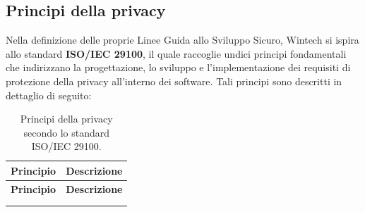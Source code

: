 \subsection{Principi della privacy}
Nella definizione delle proprie Linee Guida allo Sviluppo Sicuro, Wintech si ispira allo standard \textbf{ISO/IEC 29100}, il quale raccoglie undici principi fondamentali 
che indirizzano la progettazione, lo sviluppo e l'implementazione dei requisiti di protezione della privacy all'interno dei software. 
Tali principi sono descritti in dettaglio di seguito:

\begin{longtable}{ >{\raggedright\arraybackslash}p{} p{} }
\toprule
\textbf{Principio} & \textbf{Descrizione} \\
\midrule
\endfirsthead

\toprule
\textbf{Principio} & \textbf{Descrizione} \\
\midrule
\endhead

\midrule
\noalign{\vspace{10pt}}
\caption[]{Principi della privacy secondo lo standard ISO/IEC 29100.} \\
\endfoot


\end{longtable}
